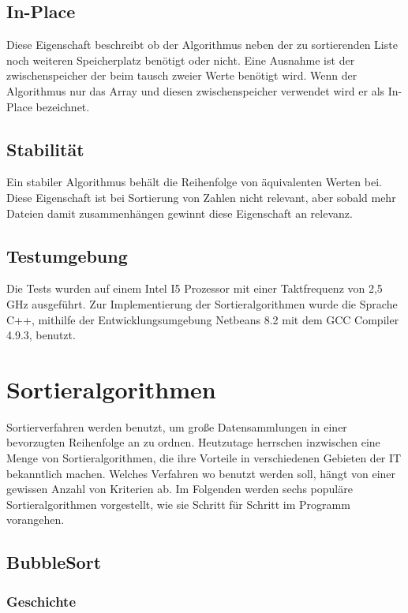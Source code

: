 \documentclass{article}
\begin{document}
\subsection{In-Place}
Diese Eigenschaft beschreibt ob der Algorithmus neben der zu sortierenden Liste noch weiteren Speicherplatz benötigt oder nicht. Eine Ausnahme ist der zwischenspeicher der beim tausch zweier Werte benötigt wird. Wenn der Algorithmus nur das Array und diesen zwischenspeicher verwendet wird er als In-Place bezeichnet. \cite{in-place}
\subsection{Stabilität}
Ein stabiler Algorithmus behält die Reihenfolge von äquivalenten Werten bei. Diese Eigenschaft ist bei Sortierung von Zahlen nicht relevant, aber sobald mehr Dateien damit zusammenhängen gewinnt diese Eigenschaft an relevanz. \cite{stability}
\subsection{Testumgebung}
Die Tests wurden auf einem Intel I5 Prozessor mit einer Taktfrequenz von 2,5 GHz ausgeführt. Zur Implementierung der Sortieralgorithmen wurde die Sprache C++, mithilfe der Entwicklungsumgebung Netbeans 8.2 mit dem GCC Compiler 4.9.3, benutzt.

\section{Sortieralgorithmen}
Sortierverfahren werden benutzt, um große Datensammlungen in einer bevorzugten Reihenfolge an zu ordnen. Heutzutage herrschen inzwischen eine Menge von Sortieralgorithmen, die ihre Vorteile in verschiedenen Gebieten der IT bekanntlich machen. Welches Verfahren wo benutzt werden soll, hängt von einer gewissen Anzahl von Kriterien ab.
Im Folgenden werden sechs populäre Sortieralgorithmen vorgestellt, wie sie Schritt für Schritt im Programm vorangehen.

\subsection{BubbleSort}
\subsubsection{Geschichte}
\end{document}
